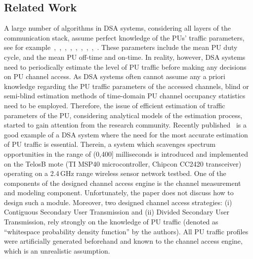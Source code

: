 \documentclass[11pt,draftclsnofoot,journal,onecolumn]{IEEEtran}
\begin{document}
\subsection{Related Work}
\label{sec:related_work}

A large number of algorithms in DSA systems, considering all layers of the communication stack, assume perfect knowledge of the PUs' traffic parameters, see for example~\cite[Sec. 2.1]{park_tmc_2011},~\cite[Sec. II-B]{gabran_tvt_2011},~\cite[Sec. II]{jiang_twc_2009},~\cite[Sec. III]{Chou_jsac_2007},~\cite[Sec. 3.1]{wang_tmc_2012},~\cite[Sec. 3.2]{wang_tmc_2011},~\cite[Sec. II]{wang_twc_2012},~\cite[Sec. II-A]{wang_tvt_2012},~\cite[Sec. III-A]{jung_ton_2012}. These parameters include the mean PU duty cycle, and the mean PU off-time and on-time. In reality, however, DSA systems need to periodically estimate the level of PU traffic before making any decisions on PU channel access. As DSA systems often cannot assume any a priori knowledge regarding the PU traffic parameters of the accessed channels, blind or semi-blind estimation methods of time-domain PU channel occupancy statistics need to be employed. Therefore, the issue of efficient estimation of traffic parameters of the PU, considering analytical models of the estimation process, started to gain attention from the research community. Recently published~\cite{plummer_tmc_2012} is a good example of a DSA system where the need for the most accurate estimation of PU traffic is essential. Therein, a system which scavenges spectrum opportunities in the range of (0,400] milliseconds is introduced and implemented on the TelosB mote (TI MSP40 microcontroller, Chipcon CC2420 transceiver) operating on a 2.4\,GHz range wireless sensor network testbed. One of the components of the designed channel access engine is the channel measurement and modeling component. Unfortunately, the paper does not discuss how to design such a module. Moreover, two designed channel access strategies: (i) Contiguous Secondary User Transmission and (ii) Divided Secondary User Transmission, rely strongly on the knowledge of PU traffic (denoted as ``whitespace probability density function'' by the authors). All PU traffic profiles were artificially generated beforehand and known to the channel access engine, which is an unrealistic assumption.
\end{document}
